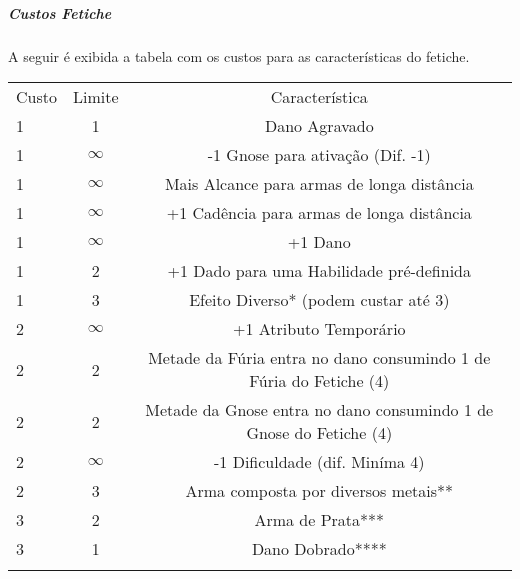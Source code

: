 \subparagraph{\bf Custos Fetiche}
A seguir é exibida a tabela com os custos para as características do fetiche.

\begin{table}[!htpb]
\centering
\label{tabela_fetiche}
\begin{tabular}{|l c c|}
\hline
Custo   &	Limite	&	Característica 	\\

\rowcolor[HTML]{EFEFEF} 
1	& 		1		&	Dano Agravado								\\

1	&	$\infty$	&	-1 Gnose para ativação (Dif. -1)			\\
\rowcolor[HTML]{EFEFEF} 
1	&	$\infty$	&	Mais Alcance para armas de longa distância	\\
 
1	&	$\infty$	&	+1 Cadência para armas de longa distância	\\
\rowcolor[HTML]{EFEFEF} 
1	&	$\infty$	&	+1 Dano										\\

1	&	 	2		&	+1 Dado para uma Habilidade pré-definida	\\
\rowcolor[HTML]{EFEFEF} 
1	& 		3		&	Efeito Diverso* (podem custar até 3)		\\

2	&	$\infty$	&	+1 Atributo Temporário						\\
\rowcolor[HTML]{EFEFEF} 
2	& 		2		&	Metade da Fúria entra no dano consumindo 1 de Fúria do Fetiche (4)			\\

2	& 		2		&	Metade da Gnose entra no dano consumindo 1 de Gnose	do Fetiche (4)			\\
\rowcolor[HTML]{EFEFEF} 
2	&	$\infty$	&	-1 Dificuldade (dif. Miníma 4)				\\

2	& 		3		&	Arma composta por diversos metais**			\\
\rowcolor[HTML]{EFEFEF} 
3	& 		2		&	Arma de Prata***							\\

3	& 		1		&	Dano Dobrado****							\\
\rowcolor[HTML]{EFEFEF} 

&&\\


\end{tabular}
\end{table}
